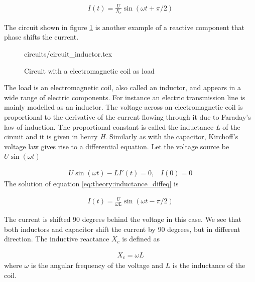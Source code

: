 \documentclass[class=book, crop=false]{standalone}
\begin{document}
\begin{equation}
   \begin{aligned}\label{eq:theory:capacitance_diffeq_solved_ohm}
I(t) = \frac{U}{X_{c}} \sin(\omega t + \pi/2)
\end{aligned} 
\end{equation}

The circuit shown in figure \ref{fig:theory:circuit_inductor} is another example of a reactive component that phase shifts the current. 

\begin{figure}[ht!]
    \center
    {circuits/circuit_inductor.tex}
    \caption[size = 9]
    {Circuit with a electromagnetic coil as load}\label{fig:theory:circuit_inductor}
\end{figure}

The load is an electromagnetic coil, also called an inductor, and appears in a wide range of electric components. For instance an electric transmission line is mainly modelled as an inductor. The voltage  across an electromagnetic coil is proportional to the derivative of the current flowing through it due to Faraday's law of induction. The proportional constant is called the inductance \textit{L} of the circuit and it is given in henry \textit{H}. Similarly as with the capacitor, Kirchoff's voltage law  gives rise to a differential equation. Let the voltage source be $U\sin{(\omega t)}$

\begin{equation}
   \begin{aligned}\label{eq:theory:inductance_diffeq}
U\sin{(\omega t)} - LI'(t) = 0, \;\;\; I(0) = 0
\end{aligned} 
\end{equation}
The solution of equation \eqref{eq:theory:inductance_diffeq} is

\begin{equation}
   \begin{aligned}\label{eq:theory:inductancee_diffeq_solved}
I(t) = \frac{U}{\omega L}  \sin(\omega t - \pi/2)
\end{aligned} 
\end{equation}


The current is shifted 90 degrees behind the voltage in this case. We see that both inductors and capacitor shift the current by 90 degrees, but in different direction. The inductive reactance $X_{c}$ is defined as

\begin{equation}
   \begin{aligned}\label{eq:theory:reactance_inductive}
X_{c} = \omega L
\end{aligned} 
\end{equation}
where $\omega$ is the angular frequency of the voltage and $L$ is the inductance of the coil. 
\end{document}
